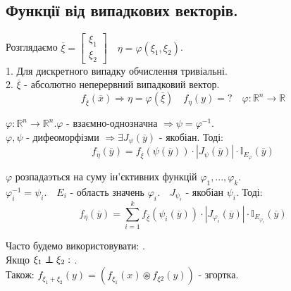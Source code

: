  \subsection{Функції від випадкових векторів.}
 Розглядаємо $ \overline{\xi} = \begin{bmatrix}
  \xi_1 \\
  \xi_2
 \end{bmatrix} \quad \eta = \varphi(\xi_1, \xi_2)$.\\
 1. Для дискретного випадку обчислення тривіальні.\\
 2. $ \overline{\xi} $ - абсолютно неперервний випадковий вектор.
 $$ f_{\overline{\xi}} (\overline{x}) \Rightarrow \eta = \varphi( \overline{\xi}) \quad f_{\eta} (y)=? \quad \varphi: \mathbb{R}^n \to \mathbb{R}$$
\begin{boxteo}
    $ \varphi: \mathbb{R}^n \to \mathbb{R}^n. \varphi$ - взаємно-однозначна $ \Rightarrow \psi = \varphi^{-1}$.\\
    $\varphi, \psi $ - дифеоморфізми $ \Rightarrow  \exists J_{\psi} ( \overline{y}) $ - якобіан. Тоді:
    $$
    f_{\overline{\eta}}  (\overline{y}) = f_{\overline{\xi}} (\psi(\overline{y})) \cdot \left| J_{\psi }(\overline{y}) \right| \cdot   \mathbb{I}_{E_{\varphi}} (\overline{y})
    $$
\end{boxteo}
\begin{boxteo}
    $\varphi$ розпадаэться на суму ін'єктивних функцій  $\varphi_1, ..., \varphi_k$.\\
    $ \varphi^{-1}_i = \psi_i. \quad E_i$ - область значень $ \varphi_i. \quad J_{\psi_i}$ - якобіан $ \psi_i$. Тоді:
    $$
    f_{\eta} (\overline{y}) =  \sum\limits_{i = 1}^{ k}{ f_{\overline{\xi}} ( \psi_i( \overline{y})) \cdot \left| J_{\varphi_i } (\overline{y}) \right|  \cdot \mathbb{I}_{E_{\varphi_i}} (\overline{y})}
    $$
\end{boxteo}
Часто будемо використовувати: .\\
Якщо $ \xi_1 \independent \xi_2: $ .\\ Також: $f_{\xi_1 + \xi_2} (y) = (f_{\xi_1}(x) \circledast f_{\xi2} (y))$ - згортка.

